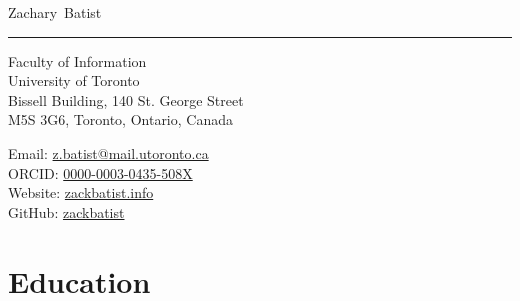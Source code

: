 \documentclass[11pt, a4paper]{article}
\makeatletter
\newcommand{\UERJ}{Universidade do Estado do Rio de Janeiro}
\newcommand{\UHM}{University of Hawai`i at M\={a}noa}
\newcommand{\SOEST}{School of Ocean and Earth Science and Technology}
\newcommand{\UHEARTH}{Department of Earth Sciences}
\newcommand{\TORINF}{Faculty of Information}
\newcommand{\TOR}{University of Toronto}
\newcommand{\FirstName}{Zachary}
\newcommand{\LastName}{Batist}
\newcommand{\MyName}{\FirstName\ \LastName}
\newcommand{\Email}{z.batist@mail.utoronto.ca}
\newcommand{\PersonalWebsite}{zackbatist.info}
\newcommand{\MyGitHub}{zackbatist}
\newcommand{\Twitter}{@mtl\_zack}
\newcommand{\Mastodon}{archaeo.social/@zackbatist}
\newcommand{\ORCID}{0000-0003-0435-508X}
\newcommand{\Affiliation}{\TORINF \\ \TOR}
\newcommand{\Address}{
  Bissell Building, 140 St. George Street \\ M5S 3G6, Toronto, Ontario, Canada
}
\newcommand{\Duration}[2]{\fontsize{10pt}{0}\selectfont #1 -- #2}
\newcommand{\Ongoing}{present}
\newcommand{\Appointment}[4]{\textbf{#1} \newline #2 \newline #3 \newline #4}
\makeatother
\begin{document}
\thispagestyle{empty}

{\fontsize{22pt}{0}\selectfont\MyName}\\[-0.1cm]
\rule{\textwidth}{0.2pt}
\begin{minipage}[t]{0.595\textwidth}
  \Affiliation
  \\
  \Address
 

\end{minipage}
\begin{minipage}[t]{0.405\textwidth}
  \begin{flushright}
    Email: \href{mailto:\Email}{\Email}
    \\
    ORCID: \href{https://orcid.org/\ORCID}{\ORCID}
    \\
    Website: \href{https://\PersonalWebsite}{\PersonalWebsite}
    \\
    GitHub: \href{https://github.com/\MyGitHub}{\MyGitHub}
  \end{flushright}
\end{minipage}




\section{Education}
\end{document}
